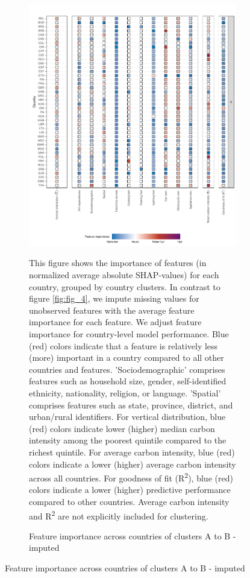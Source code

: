 \clearpage
\begin{figure}[ht!]\ContinuedFloat
    \centering
    \begin{subfigure}[b]{\textwidth}
    \centering
    \includegraphics{Figure 4/Figure_4_Corrected_Imputed_1.pdf}
    \caption{Feature importance across countries of clusters A to B - imputed}\label{fig:fig_4_1_imputed}\label{fig:fig_4_imputed}
    \begin{subcaption2}
    This figure shows the importance of features (in normalized average absolute SHAP-values) for each country, grouped by country clusters. In contrast to figure \ref{fig:fig_4}, we impute missing values for unobserved features with the average feature importance for each feature. We adjust feature importance for country-level model performance. Blue (red) colors indicate that a feature is relatively less (more) important in a country compared to all other countries and features. 'Sociodemographic' comprises features such as household size, gender, self-identified ethnicity, nationality, religion, or language. 'Spatial' comprises features such as state, province, district, and urban/rural identifiers. For vertical distribution, blue (red) colors indicate lower (higher) median carbon intensity among the poorest quintile compared to the richest quintile. For average carbon intensity, blue (red) colors indicate a lower (higher) average carbon intensity across all countries. For goodness of fit (R\textsuperscript{2}), blue (red) colors indicate a lower (higher) predictive performance compared to other countries. Average carbon intensity and R\textsuperscript{2} are not explicitly included for clustering.

\end{subcaption2}
\end{subfigure}
\end{figure}
